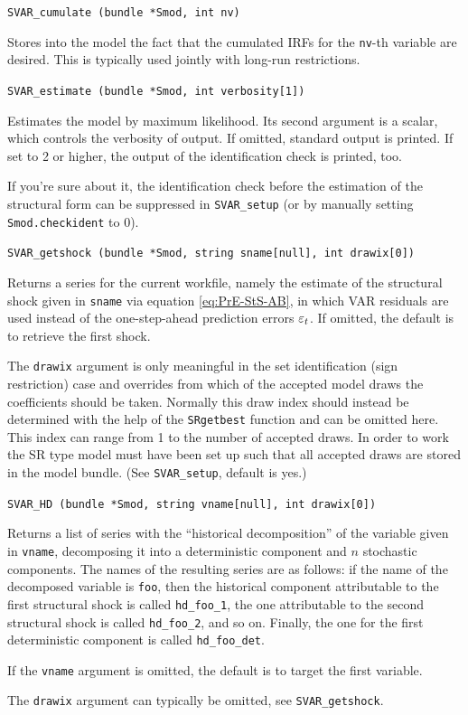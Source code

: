 \documentclass[a4paper,10pt]{article}
\newenvironment{funcdoc}[1]
{\noindent\hrulefill\newline\nopagebreak\texttt{#1}%
\nopagebreak\par\noindent\hrulefill%
\nopagebreak\par\nopagebreak\smallskip\nopagebreak\par}
{\bigskip}
\newcommand{\PrE}[1]{\ensuremath \varepsilon_{#1}}
\begin{document}
\begin{funcdoc}{SVAR\_cumulate (bundle *Smod, int nv)}
  \noindent Stores into the model the fact that the cumulated IRFs for
  the \texttt{nv}-th variable are desired. This is typically used jointly
  with long-run restrictions.
\end{funcdoc}

\begin{funcdoc}{SVAR\_estimate (bundle *Smod, int verbosity[1])}
  \noindent Estimates the model by maximum likelihood. Its second argument is a
  scalar, which controls the verbosity of output. If omitted,
  standard output is printed. If set to 2 or higher, the output of the 
  identification check is printed, too.
  
  If you're sure about it, the identification check before
  the estimation of the structural form can be suppressed in 
  \texttt{SVAR\_setup} (or by manually setting \texttt{Smod.checkident}
  to 0).
\end{funcdoc}

\begin{funcdoc}{SVAR\_getshock (bundle *Smod, string sname[null], int drawix[0])}
  \noindent Returns a series for the current workfile, namely the estimate of the 
  structural shock given in \texttt{sname} via equation \eqref{eq:PrE-StS-AB}, 
  in which VAR residuals are used instead of the one-step-ahead prediction errors
  $\PrE{t}$. If omitted, the default is to retrieve the first shock.
  
  The \texttt{drawix} argument is only meaningful in the set identification 
  (sign restriction) case and overrides from which of the accepted model draws 
  the coefficients should be taken. Normally this draw index should instead be determined 
  with the help of the \texttt{SRgetbest} function and can be omitted here. 
  This index can range from 1 to the number
  of accepted draws. In order to work the SR type model must have been set up such that all
  accepted draws are stored in the model bundle. (See \texttt{SVAR\_setup},
  default is yes.)
\end{funcdoc}

\begin{funcdoc}{SVAR\_HD (bundle *Smod, string vname[null], int drawix[0])}
  \noindent Returns a list of series with 
  the ``historical decomposition'' of the variable given in \texttt{vname},
  decomposing it into a deterministic component
  and $n$ stochastic components. The names of the resulting series are
  as follows: if the name of the decomposed variable is \texttt{foo},
  then the historical component attributable to the first structural
  shock is called \texttt{hd\_foo\_1}, the one attributable to the
  second structural shock is called \texttt{hd\_foo\_2}, and so
  on. Finally, the one for the first deterministic component is called
  \texttt{hd\_foo\_det}.
  
  If the \texttt{vname} argument is omitted, the default is to target the first variable.
  
  The \texttt{drawix} argument can typically be omitted, see \texttt{SVAR\_getshock}.
\end{funcdoc}
\end{document}

